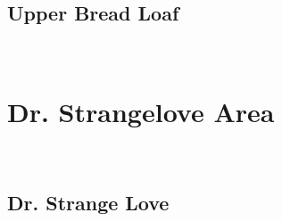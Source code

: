 \begin{multicols}{2}
			\begin{minipage}{\columnwidth}
			\subsection*{Upper Bread Loaf}\label{bf:Upper Bread Loaf}
			\
			
			\end{minipage}
			
\newpage
		\section{Dr. Strangelove Area}\label{sa:Dr. Strangelove Area}
	\begin{minipage}{\columnwidth}
	\
	\end{minipage}
	
			\begin{minipage}{\columnwidth}
			\subsection*{Dr. Strange Love}\label{bf:Dr. Strange Love}
			\
			
			\end{minipage}
			
\end{multicols}
\clearpage